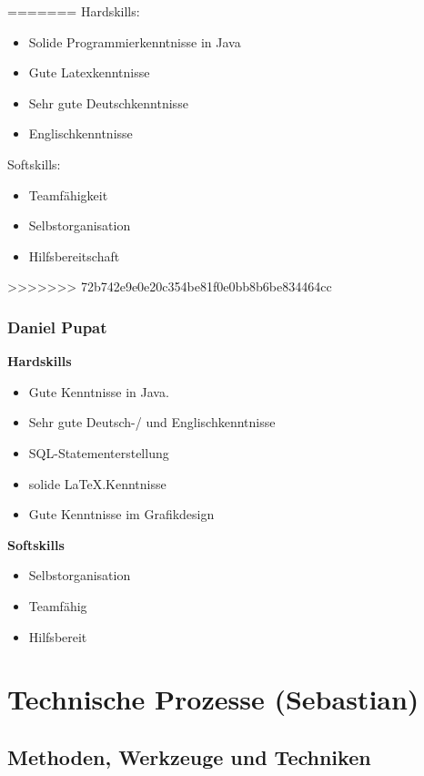 \documentclass[fontsize=12pt,paper=a4,twoside]{scrartcl}
\begin{document}
=======
Hardskills:
\begin{itemize}
\item Solide Programmierkenntnisse in Java
\item Gute Latexkenntnisse
\item Sehr gute Deutschkenntnisse
\item Englischkenntnisse
\end{itemize}

Softskills: 
\begin{itemize}
\item Teamfähigkeit
\item Selbstorganisation
\item Hilfsbereitschaft
\end{itemize}




>>>>>>> 72b742e9e0e20c354be81f0e0bb8b6be834464cc
\subsubsection{Daniel Pupat}

\textbf{Hardskills}
\begin{itemize}
\item{Gute Kenntnisse in Java.}
\item{Sehr gute Deutsch-/ und Englischkenntnisse}
\item{SQL-Statementerstellung}
\item{solide \LaTeX.Kenntnisse}
\item{Gute Kenntnisse im Grafikdesign}
\end{itemize}
\textbf{Softskills}
\begin{itemize}
\item{Selbstorganisation}
\item{Teamfähig}
\item{Hilfsbereit}
\end{itemize}


\section{Technische Prozesse (Sebastian)}
\subsection{Methoden, Werkzeuge und Techniken}
\end{document}
